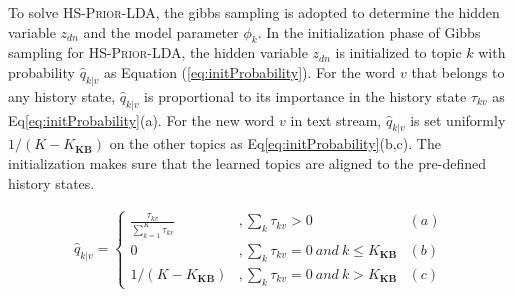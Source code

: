 \documentclass{article}
\begin{document}

To solve \textsc{HS-Prior-LDA}, the gibbs sampling is adopted to determine the hidden variable \(z_{dn}\) and the model parameter \(\phi_k\).
In the initialization phase of Gibbs sampling for \textsc{HS-Prior-LDA}, the hidden variable \(z_{dn}\) is initialized to topic \(k\) with probability \(\hat{q}_{k|v}\) as Equation (\ref{eq:initProbability}).
For the word \(v\) that belongs to any history state, \(\hat{q}_{k|v}\) is proportional to its importance in the history state \(\tau_{kv}\) as Eq\ref{eq:initProbability}(a). 
For the new word \(v\) in text stream, \(\hat{q}_{k|v}\) is   set uniformly \(1/(K-K_{\bm{KB}})\) on the other topics as Eq\ref{eq:initProbability}(b,c). 
The initialization makes sure that the learned topics are aligned to the pre-defined history states.
\begin{scriptsize} 
\begin{equation}
\label{eq:initProbability}
\begin{aligned}
\hat{q}_{k|v}=
\left\{ \begin{aligned}
\frac{\tau_{kv}}{\sum_{k=1}^{K}\tau_{kv}} &,\sum_{k}\tau_{kv}>0 & (a)\\
0&, \sum_{k}\tau_{kv}=0 \ and \ k \leq K_{\bm{KB}} & (b)\\
1/(K-K_{\bm{KB}})&,\sum_{k}\tau_{kv}=0 \ and \ k > K_{\bm{KB}} & (c)
\end{aligned}\right.
\end{aligned}
\end{equation}
\end{scriptsize}
\end{document}
